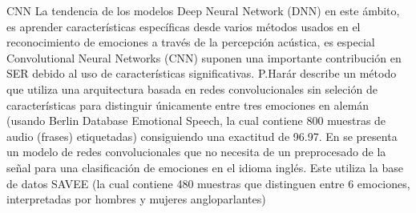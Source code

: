 \documentclass[11pt,a4paper,spanish]{book}
\begin{document}
		CNN
		La tendencia de los modelos Deep Neural Network (DNN) en este ámbito, es aprender características específicas desde varios métodos usados en el reconocimiento de emociones a través de la percepción acústica, es especial Convolutional Neural Networks (CNN) suponen una importante contribución en SER debido al uso de características significativas.
		P.Harár \cite{Harar2017} describe un método que utiliza una arquitectura basada en redes convolucionales sin seleción de características para distinguir únicamente entre tres emociones en alemán (usando Berlin Database Emotional Speech, la cual contiene 800 muestras de audio (frases) etiquetadas) consiguiendo una exactitud de 96.97. En \cite{AbdulQayyum2019} se presenta un modelo de redes convolucionales que no necesita de un preprocesado de la señal para una clasificación de emociones en el idioma inglés. Este utiliza la base de datos SAVEE (la cual contiene 480 muestras que distinguen entre 6 emociones, interpretadas por hombres y mujeres angloparlantes)
		
	\printbibliography
	
\end{document}
